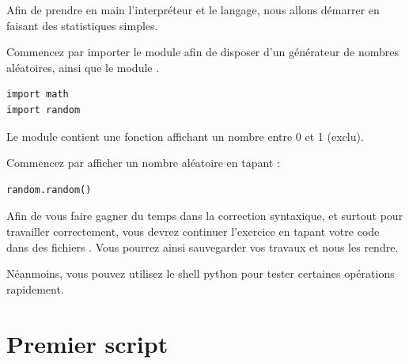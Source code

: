 \documentclass[11pt,a4paper]{article}
\begin{document}
\medskip

Afin de prendre en main l'interpréteur et le langage, nous allons démarrer en faisant des statistiques simples.


Commencez par importer le module  afin de disposer d'un générateur de nombres aléatoires, ainsi que le module .

\begin{center}
\begin{lstlisting}[style=python,morekeywords={floor,ceil}]
import math
import random \end{lstlisting}
\end{center}

Le module  contient une fonction  affichant un nombre entre 0 et 1 (exclu).


Commencez par afficher un nombre aléatoire en tapant :

\begin{center}
\begin{lstlisting}[style=python,morekeywords={floor,ceil}]
random.random() \end{lstlisting}
\end{center}








\bigskip

Afin de vous faire gagner du temps dans la correction syntaxique, et surtout pour travailler correctement, vous devrez continuer l'exercice en tapant votre code dans des fichiers .
Vous pourrez ainsi sauvegarder vos travaux et nous les rendre.

Néanmoins, vous pouvez utilisez le shell python pour tester certaines opérations rapidement.


\newpage %
\section{Premier script}
\end{document}
